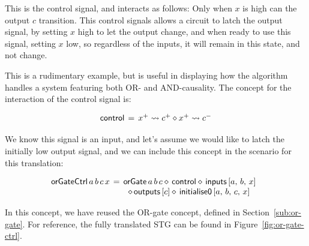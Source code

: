 \documentclass[british, journal]{IEEEtran}
\begin{document}
This is the control signal, and interacts as follows:
Only when $x$ is high can the output $c$ transition. This control signals
allows a circuit to latch the output signal, by setting $x$ high to let
the output change, and when ready to use this signal, setting $x$ low,
so regardless of the inputs, it will remain in this state, and not change.

This is a rudimentary example, but is useful in displaying how the algorithm
handles a system featuring both OR- and AND-causality. The concept for 
the interaction of the control signal is:

\vspace{-4mm}
\[
\begin{array}{lcl}
\mathsf{control}&\hspace{-2mm}=&\hspace{-2mm}x^{+} \rightsquigarrow c^{+} \diamond x^{+} \rightsquigarrow c^{-} 
\end{array}
\]

We know this signal is an input, and let's assume we would like to latch
the initially low output signal, and we can include this concept in the 
scenario for this translation:

\vspace{-3mm}
\[
\begin{array}{lcl}
\hspace{-2mm}\mathsf{orGateCtrl}\,  a \, b \, c \, x &\hspace{-2mm}=&\hspace{-2mm}\mathsf{orGate}\, a\, b\, c \diamond\, \mathsf{control}
\diamond\, \mathsf{inputs}\, [a,\, b,\, x] \\
&& \diamond \, \mathsf{outputs} \,  [c] \diamond\, \mathsf{initialise0}\, [a,\, b,\, c,\, x]
\end{array}
\]

In this concept, we have reused the OR-gate concept, defined in Section~\ref{sub:or-gate}. 
For reference, the fully translated STG can be found in Figure~\ref{fig:or-gate-ctrl}.

\vspace{-3mm}
\end{document}
